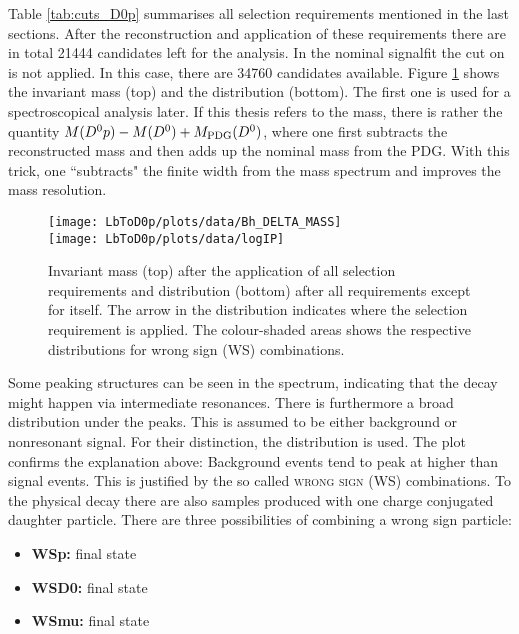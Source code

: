 Table \ref{tab:cuts_D0p} summarises all selection requirements mentioned in the last sections.
After the reconstruction and application of these requirements there are in total 21444 \LbToDpmunuX candidates left for the analysis.
In the nominal signalfit the cut on \logIP is not applied.
In this case, there are 34760 candidates available.
Figure \ref{fig:plot_mD0p_logIP} shows the invariant \Dz\proton mass (top) and the \logIP distribution (bottom). 
The first one is used for a spectroscopical analysis later.
If this thesis refers to the \Dz\proton mass, there is rather the quantity $M({{D}^0}{p}) - M({{D}^0}) + M_\text{PDG}({{D}^0})$, where one first subtracts the reconstructed \Dz mass and then adds up the nominal \Dz mass from the PDG.
With this trick, one ``subtracts" the finite width from the \Dz\proton mass spectrum and improves the mass resolution.
\begin{figure}[tb]
	\centering
	\texttt{[image: LbToD0p/plots/data/Bh\_DELTA\_MASS]} \\
	\texttt{[image: LbToD0p/plots/data/logIP]}
	\caption{Invariant \Dz\proton mass (top) after the application of all selection requirements and \logIP distribution (bottom) after all requirements except for \logIP itself.
             The arrow in the \logIP distribution indicates where the selection requirement is applied.
             The colour-shaded areas shows the respective distributions for wrong sign (WS) combinations.}
	\label{fig:plot_mD0p_logIP}
\end{figure}
Some peaking structures can be seen in the spectrum, indicating that the decay \LbToDpmunuX might happen via intermediate resonances.
There is furthermore a broad distribution under the peaks.
This is assumed to be either background or nonresonant signal.
For their distinction, the \logIP distribution is used.
The plot confirms the explanation above:
Background events tend to peak at higher \logIP than signal events. 
This is justified by the so called \textsc{wrong sign (WS)} combinations.
To the physical decay \LbToDpmunuX there are also samples produced with one charge conjugated daughter particle.
There are three possibilities of combining a wrong sign particle:
\begin{itemize}
    \item \textbf{WSp:} \Dz\antiproton\mun final state
    \item \textbf{WSD0:} \Dzb\proton\mun final state
    \item \textbf{WSmu:} \Dz\proton\mup final state
\end{itemize}
